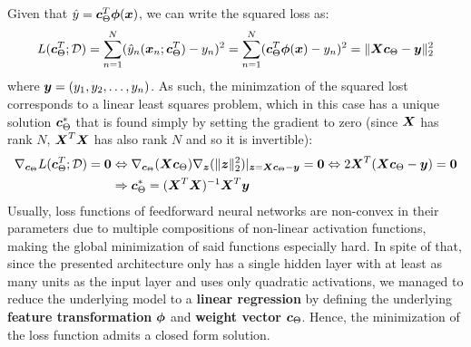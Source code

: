 \documentclass{exam}
\begin{document}
\begin{questions}
        \question
        Given that $\hat{y} = \vb*{c}^T_{\Theta} \vb*{\phi}(\vb*{x})$, we can write the squared loss as:
        \[
            L(\vb*{c}^T_{\Theta}; \mathcal{D}) = \sum_{n = 1}^{N} (\hat{y}_n(\vb*{x}_n; \vb*{c}^T_{\Theta}) - y_n) ^2 = \sum_{n = 1}^{N} (\vb*{c}^T_{\Theta} \vb*{\phi}(\vb*{x}) - y_n) ^2 = \|\vb*{X}\vb*{c}_{\Theta} - \vb*{y} \|_2^2
        \]
        where $\vb*{y} = (y_1, y_2, \dots, y_n)$. As such, the minimzation of the squared lost corresponds to a linear least squares problem, which in this case has a unique solution $\vb*{c}^*_{\Theta}$ that is found simply by setting the gradient to zero (since $\vb*{X}$ has rank $N$, $\vb*{X}^T\vb*{X}$ has also rank $N$ and so it is invertible):
        \begin{align*}
            \nabla_{\vb*{c}_{\Theta}} L(\vb*{c}^T_{\Theta}; \mathcal{D}) = \vb*{0} &\Leftrightarrow \nabla_{\vb*{c}_{\Theta}}(\vb*{X}\vb*{c}_{\Theta}) \nabla_{\vb*{z}}(\|\vb*{z}\|_2^2) \rvert_{\vb*{z} = \vb*{X}\vb*{c}_{\Theta} - \vb*{y}} = \vb*{0} \Leftrightarrow 2\vb*{X}^T(\vb*{X}\vb*{c}_{\Theta} - \vb*{y}) = \vb*{0} \\
            &\Rightarrow \vb*{c}^*_{\Theta} = (\vb*{X}^T\vb*{X})^{-1}\vb*{X}^T\vb*{y}
        \end{align*}
        Usually, loss functions of feedforward neural networks are non-convex in their parameters due to multiple compositions of non-linear activation functions, making the global minimization of said functions especially hard. In spite of that, since the presented architecture only has a single hidden layer with at least as many units as the input layer and uses only quadratic activations, we managed to reduce the underlying model to a \textbf{linear regression} by defining the underlying \textbf{feature transformation} $\vb*{\phi}$ and \textbf{weight vector} $\vb*{c}_{\Theta}$. Hence, the minimization of the loss function admits a closed form solution.
    \end{questions}
\end{document}
